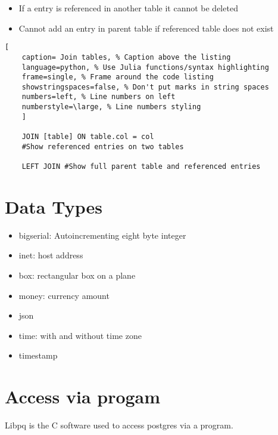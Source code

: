 \documentclass[11pt]{scrartcl} %
\begin{document}
\begin{itemize}
	\item If a entry is referenced in another table it cannot be deleted 
	\item Cannot add an entry in parent table if referenced table does not exist
\end{itemize}

\begin{lstlisting}[
	caption= Join tables, % Caption above the listing
	language=python, % Use Julia functions/syntax highlighting
	frame=single, % Frame around the code listing
	showstringspaces=false, % Don't put marks in string spaces
	numbers=left, % Line numbers on left
	numberstyle=\large, % Line numbers styling
	]

	JOIN [table] ON table.col = col
	#Show referenced entries on two tables

	LEFT JOIN #Show full parent table and referenced entries

\end{lstlisting}

\section{Data Types}

\begin{itemize}
	\item bigserial: Autoincrementing eight byte integer
	\item inet: host address
	\item box: rectangular box on a plane
	\item money: currency amount
	\item json
	\item time: with and without time zone
	\item timestamp
\end{itemize}

\section{Access via progam}

Libpq is the C software used to access postgres via a program.
\end{document}
